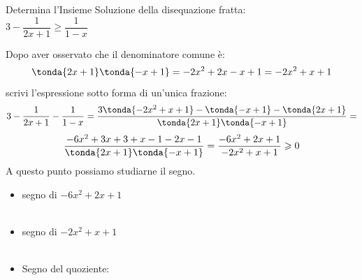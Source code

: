 \begin{esempio}{}{}
Determina l'Insieme Soluzione della disequazione fratta:\\ 
\(3-\dfrac{1}{2x+1} \geqslant \dfrac{1}{1-x}\)

\medskip
Dopo aver osservato che il denominatore comune è:
\[\tonda{2x+1}\tonda{-x+1} = -2x^2 +2x -x +1 = -2x^2 +x +1\]
scrivi l'espressione sotto forma di un'unica frazione:
\[3-\dfrac{1}{2x+1} - \dfrac{1}{1-x} =
  \dfrac{3 \tonda{-2x^2 +x +1} - \tonda{-x+1} - \tonda{2x+1}}
        {\tonda{2x+1}\tonda{-x+1}} =\]
\[\dfrac{-6x^2 +3x +3 +x-1 -2x-1}
        {\tonda{2x+1}\tonda{-x+1}} = 
  \dfrac{-6x^2 +2x +1}
        {-2x^2 +x +1} \geqslant 0\]
A questo punto possiamo studiarne il segno.

\begin{itemize}[left=0mm]
\item segno di \(-6x^2 +2x +1\)\\[-2mm]
\hspace*{-3mm}\\
\hspace*{-3mm}

\item segno di \(-2x^2 +x +1\)\\[-2mm]
\hspace*{-3mm}\\
\hspace*{-3mm}

\item Segno del quoziente: \quad %
\raisebox{-10mm}
{
{\segnofrazionec}}
\end{itemize}


\end{esempio}
